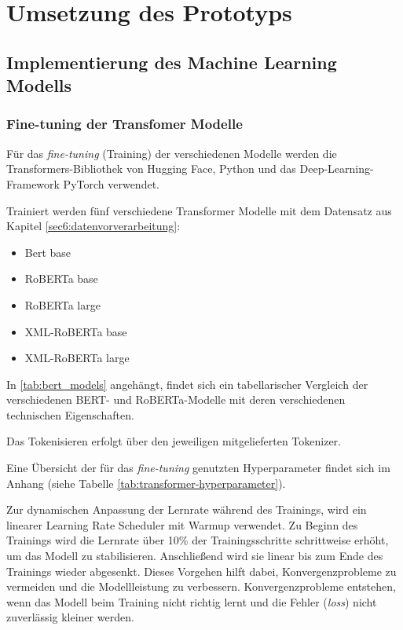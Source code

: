 \chapter{Umsetzung des Prototyps}
\label{chap:umsetzung_des_prototyps}

\section{Implementierung des Machine Learning Modells}

\subsection{Fine-tuning der Transfomer Modelle}

Für das \textit{fine-tuning} (Training) der verschiedenen Modelle werden die Transformers-Bibliothek von Hugging Face, Python und das Deep-Learning-Framework PyTorch verwendet.

Trainiert werden fünf verschiedene Transformer Modelle mit dem Datensatz aus Kapitel \ref{sec6:datenvorverarbeitung}:
\begin{itemize}
    \item Bert base
    \item RoBERTa base
    \item RoBERTa large
    \item XML-RoBERTa base
    \item XML-RoBERTa large
\end{itemize}

In \ref{tab:bert_models} angehängt, findet sich ein tabellarischer Vergleich der verschiedenen BERT- und RoBERTa-Modelle mit deren verschiedenen technischen Eigenschaften.

Das Tokenisieren erfolgt über den jeweiligen mitgelieferten Tokenizer.

Eine Übersicht der für das \textit{fine-tuning} genutzten Hyperparameter findet sich im Anhang (siehe Tabelle \ref{tab:transformer-hyperparameter}).

Zur dynamischen Anpassung der Lernrate während des Trainings, wird ein linearer Learning Rate Scheduler mit Warmup verwendet.
Zu Beginn des Trainings wird die Lernrate über 10\% der Trainingsschritte schrittweise erhöht, um das Modell zu stabilisieren. 
Anschließend wird sie linear bis zum Ende des Trainings wieder abgesenkt. Dieses Vorgehen hilft dabei, Konvergenzprobleme zu vermeiden und die Modellleistung zu verbessern.
Konvergenzprobleme entstehen, wenn das Modell beim Training nicht richtig lernt und die Fehler (\textit{loss}) nicht zuverlässig kleiner werden.

